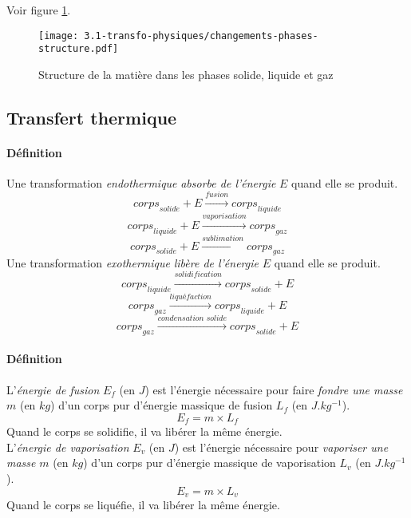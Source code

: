 Voir figure \ref{fig:changements-phases-structure}.

\begin{figure}[!h]
  \begin{center}
      \texttt{[image: 3.1-transfo-physiques/changements-phases-structure.pdf]}
  \end{center}
  \caption{Structure de la matière dans les phases solide, liquide et gaz}
  \label{fig:changements-phases-structure}
\end{figure}

\subsection{Transfert thermique}
\paragraph{Définition} Une transformation \textit{endothermique} \textit{absorbe de l'énergie} $E$ quand elle se produit.\\
$$\textit{corps}_{\textit{solide}} + E \xrightarrow{\textit{fusion}} \textit{corps}_{\textit{liquide}}$$
$$\textit{corps}_{\textit{liquide}} + E \xrightarrow{\textit{vaporisation}} \textit{corps}_{\textit{gaz}}$$
$$\textit{corps}_{\textit{solide}} + E \xrightarrow{\textit{sublimation}} \textit{corps}_{\textit{gaz}}$$  
Une transformation \textit{exothermique} \textit{libère de l'énergie} $E$ quand elle se produit.\\
$$\textit{corps}_{\textit{liquide}} \xrightarrow{\textit{solidification}} \textit{corps}_{\textit{solide}} + E$$
$$\textit{corps}_{\textit{gaz}}  \xrightarrow{\textit{liquéfaction}} \textit{corps}_{\textit{liquide}} + E$$
$$\textit{corps}_{\textit{gaz}}  \xrightarrow{\textit{condensation~solide}} \textit{corps}_{\textit{solide}} + E$$


\paragraph{Définition} L'\textit{énergie de fusion} $E_f$ (en $J$) est l'énergie nécessaire pour faire \textit{fondre une masse} $m$ (en $kg$) d'un corps pur d'énergie massique de fusion $L_f$ (en $J.kg^{-1}$). $$ E_f = m \times L_f $$ Quand le corps se solidifie, il va libérer la même énergie. \\

L'\textit{énergie de vaporisation} $E_v$ (en $J$) est l'énergie nécessaire pour  \textit{vaporiser une masse} $m$ (en $kg$) d'un corps pur d'énergie massique de vaporisation $L_v$ (en $J.kg^{-1}$).$$ E_v = m \times L_v $$ 
Quand le corps se liquéfie, il va libérer la même énergie.


